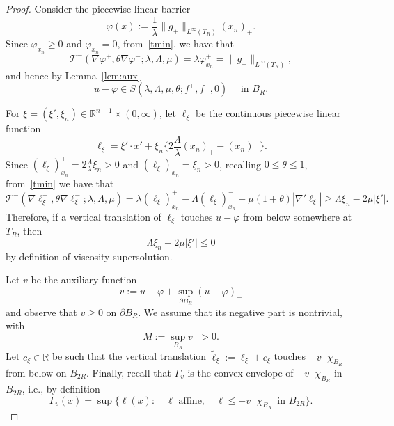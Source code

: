 \documentclass[letter,11pt]{amsart}
\newcommand{\R}{\mathbb{R}}
\newcommand{\chara}[1]{\chi_{#1}}
\newcommand{\tcal}{\mathcal{T}}
\theoremstyle{definition}
\numberwithin{equation}{section}
\begin{document}
\begin{proof}
Consider the piecewise linear barrier
\begin{equation}
\label{abp:bar}
\varphi(x) := \frac{1}{\lambda} \|g_{+}\|_{L^{\infty}(T_R)} (x_n)_{+}.
\end{equation}
Since $\varphi_{x_n}^{+} \geq 0$ and $\varphi_{x_n}^{-} = 0$, from~\eqref{tmin}, we have that
\[
\tcal^{-}(\nabla \varphi^{+},\theta \nabla \varphi^{-}; \lambda, \Lambda, \mu)
= \lambda \varphi_{x_n}^{+}
=  \|g_{+}\|_{L^{\infty}(T_R)},
\]
and hence by Lemma~\ref{lem:aux}
\begin{equation}
\label{abp:sup}
u- \varphi \in \overline{S}(\lambda, \Lambda, \mu, \theta; f^{+}, f^{-}, 0) \quad \text{ in } B_R.
\end{equation}

\medskip

For $\xi = (\xi', \xi_n) \in \R^{n-1} \times (0,\infty)$, let $\ell_{\xi}$ be the continuous piecewise linear function
\begin{equation}
\label{abp:piece}
\ell_{\xi} 
= \xi' \cdot x' + \xi_n\Big\{ 2\frac{\Lambda}{\lambda} (x_n)_{+} - (x_n)_{-}\Big\}.
\end{equation}
Since $(\ell_{\xi})_{x_n}^{+} = 2 \frac{\Lambda}{\lambda}\xi_n >0$ and $(\ell_{\xi})_{x_n}^{-} = \xi_n >0$, recalling $0 \leq \theta \leq 1$, from~\eqref{tmin} we have that
\[
\tcal^{-} (\nabla \ell_{\xi}^{+}, \theta \nabla \ell_{\xi}^{-}; \lambda, \Lambda, \mu) 
= \lambda(\ell_{\xi})_{x_n}^{+} - \Lambda (\ell_{\xi})_{x_n}^{-} - \mu(1+\theta) |\nabla' \ell_{\xi}|
\geq \Lambda \xi_n - 2 \mu |\xi'|.
\]
Therefore, if a vertical translation of $\ell_{\xi}$ touches $u-\varphi$ from below somewhere at $T_R$, then 
\begin{equation}
\label{abp:trans}
\Lambda \xi_n - 2\mu |\xi'| \leq 0
\end{equation}
by definition of viscosity supersolution.

\medskip

Let $v$ be the auxiliary function
\begin{equation}
\label{abp:v}
v := u- \varphi + \sup_{\partial B_R} (u-\varphi)_{-}
\end{equation}
and observe that $v \geq 0$ on $\partial B_R$.
We assume that its negative part is nontrivial, with
\begin{equation}
\label{abp:mdef}
M := \sup_{B_R} v_{-} > 0.
\end{equation}
Let $c_{\xi} \in \R$ be such that the vertical translation $\widetilde{\ell}_{\xi} := \ell_{\xi} + c_{\xi}$ touches $- v_{-} \chara{B_R}$ from below on $\overline{B}_{2R}$.
Finally, recall that $\Gamma_{v}$ is the convex envelope of $- v_{-} \chara{B_R}$ in $B_{2R}$, i.e., by definition
\[
\Gamma_v(x) = \sup\big\{
\ell(x) \colon \quad \ell \text{ affine}, \quad \ell \leq - v_{-} \chara{B_R} \, \text{ in } B_{2R}
\big\}.
\]


\end{proof}
\end{document}
